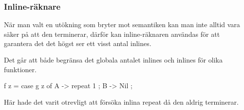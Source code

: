 \documentclass[../Optimise]{subfiles}
\begin{document}
\subsubsection{Inline-räknare}
När man valt en utökning som bryter mot semantiken kan man inte alltid vara säker på
att den terminerar, därför kan inline-räknaren användas för att garantera det det högst
ser ett visst antal inlines.

Det går att både begränsa det globala antalet inlines och inlines för olika funktioner.

\begin{codeEx}
f z = case g z of
    { A -> repeat 1
    ; B -> Nil
    };
\end{codeEx}

Här hade det varit otrevligt att försöka inlina repeat då den aldrig terminerar.
\end{document}
